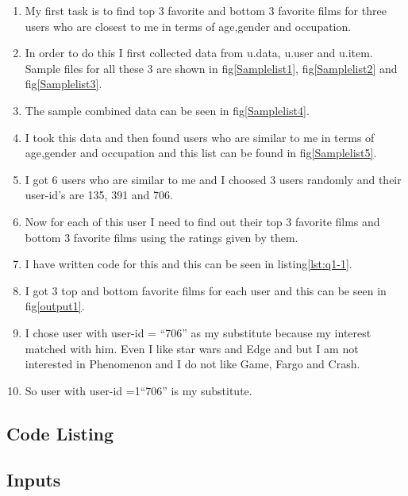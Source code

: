 \begin{enumerate}
\item My first task is to find top 3 favorite and bottom 3 favorite films for three users who are closest to me in terms of age,gender and occupation.
\item In order to do this I first collected data from u.data, u.user and u.item. Sample files for all these 3 are shown in fig\ref{Samplelist1}, fig\ref{Samplelist2} and fig\ref{Samplelist3}.
\item The sample combined data can be seen in fig\ref{Samplelist4}.
\item I took this data and then found users who are similar to me in terms of age,gender and occupation and this list can be found in fig\ref{Samplelist5}.
\item I got 6 users who are similar to me and I choosed 3 users randomly and their user-id's are 135, 391 and 706.
\item Now for each of this user I need to find out their top 3 favorite films and bottom 3 favorite films using the ratings given by them.
\item I have written code for this and this can be seen in listing\ref{lst:q1-1}.
\item I got 3 top and bottom favorite films for each user and this can be seen in fig\ref{output1}.
\item I chose user with user-id = ``706'' as my substitute because my interest matched with him. Even I like star wars and Edge and but I am not interested in Phenomenon and I do not like Game, Fargo and Crash. 
\item So user with user-id =1``706''  is my substitute. 
\end{enumerate}

\subsection{Code Listing}


\newpage

\subsection{Inputs}

